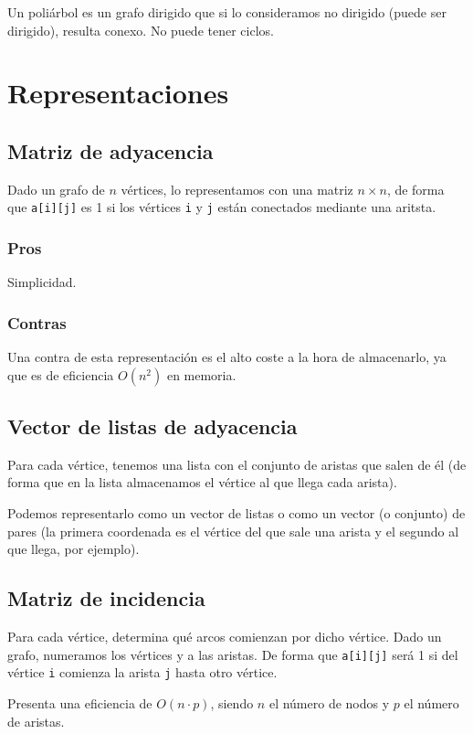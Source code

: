 \begin{definicion}
    Un poliárbol es un grafo dirigido que si lo consideramos no dirigido (puede ser dirigido), resulta conexo. No puede tener ciclos.
\end{definicion}

\section{Representaciones}
\subsection{Matriz de adyacencia}
Dado un grafo de $n$ vértices, lo representamos con una matriz $n\times n$, de forma que \verb|a[i][j]| es 1 si los vértices \verb|i| y \verb|j| están conectados mediante una aritsta.

\subsubsection{Pros}
Simplicidad.

\subsubsection{Contras}
Una contra de esta representación es el alto coste a la hora de almacenarlo, ya que es de eficiencia $O(n^2)$ en memoria.

\subsection{Vector de listas de adyacencia}
Para cada vértice, tenemos una lista con el conjunto de aristas que salen de él (de forma que en la lista almacenamos el vértice al que llega cada arista).

Podemos representarlo como un vector de listas o como un vector (o conjunto) de pares (la primera coordenada es el vértice del que sale una arista y el segundo al que llega, por ejemplo).

\subsection{Matriz de incidencia}
Para cada vértice, determina qué arcos comienzan por dicho vértice. Dado un grafo, numeramos los vértices y a las aristas. De forma que \verb|a[i][j]| será 1 si del vértice \verb|i| comienza la arista \verb|j| hasta otro vértice.

Presenta una eficiencia de $O(n\cdot p)$, siendo $n$ el número de nodos y $p$ el número de aristas.

